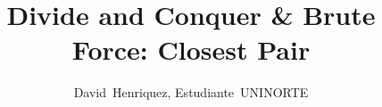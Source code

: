\documentclass[journal,onecolumn]{IEEEtran}
\begin{document}
\title{Divide and Conquer \& Brute Force: Closest Pair}
\author{David~Henriquez, {Estudiante~UNINORTE}}%
%
{}
\maketitle








\end{document}
